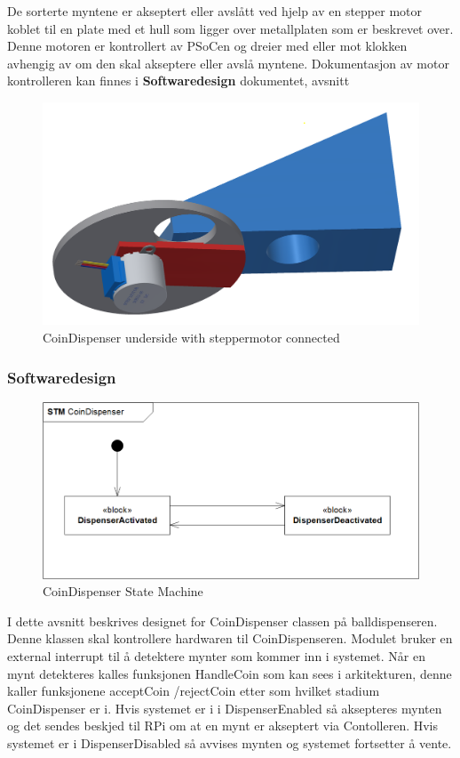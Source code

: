 \documentclass[Rapport/Rapport_main.tex]{subfiles}
\begin{document}
De sorterte myntene er akseptert eller avslått ved hjelp av en stepper motor koblet til en plate med et hull som ligger over metallplaten som er beskrevet over. Denne motoren er kontrollert av PSoCen og dreier med eller mot klokken avhengig av om den skal akseptere eller avslå myntene. Dokumentasjon av motor kontrolleren kan finnes i \textbf{Softwaredesign} dokumentet, avsnitt 

\begin{figure}[H]
    \centering
    \includegraphics[width=1\textwidth]{Rapport/BallDispenser/CoinDispenser/graphics/coinmaster-under.png}
    \caption{CoinDispenser underside with steppermotor connected}
    \label{fig:coin_dispenser_bottom}
\end{figure}

\subsubsection{Softwaredesign}
\begin{figure}[H]
    \centering
    \includegraphics[width=1\textwidth]{Rapport/BallDispenser/CoinDispenser/graphics/CoinSTM.png}
    \caption{CoinDispenser State Machine}
    \label{fig:CoinSTM}
\end{figure}
I dette avsnitt beskrives designet for CoinDispenser classen på balldispenseren. Denne klassen skal kontrollere hardwaren til CoinDispenseren. Modulet bruker en external interrupt til å detektere mynter som kommer inn i systemet. Når en mynt detekteres kalles funksjonen HandleCoin som kan sees i arkitekturen, denne kaller funksjonene acceptCoin /rejectCoin etter som hvilket stadium CoinDispenser er i. Hvis systemet er i i DispenserEnabled så aksepteres mynten og det sendes beskjed til RPi om at en mynt er akseptert via Contolleren. Hvis systemet er i DispenserDisabled så avvises mynten og systemet fortsetter å vente.
\end{document}
